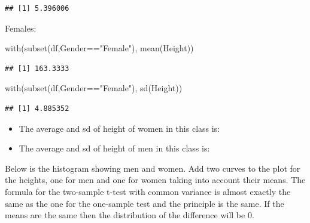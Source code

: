 \documentclass[
]{gitbook}
\newenvironment{Shaded}{\begin{snugshade}}{\end{snugshade}}
\newcommand{\FunctionTok}[1]{\textcolor[rgb]{0.00,0.00,0.00}{#1}}
\newcommand{\NormalTok}[1]{#1}
\newcommand{\SpecialCharTok}[1]{\textcolor[rgb]{0.00,0.00,0.00}{#1}}
\newcommand{\StringTok}[1]{\textcolor[rgb]{0.31,0.60,0.02}{#1}}
\providecommand{\tightlist}{%
  \setlength{\itemsep}{0pt}\setlength{\parskip}{0pt}}
\begin{document}
\begin{verbatim}
## [1] 5.396006
\end{verbatim}

Females:

\begin{Shaded}
\begin{Highlighting}[]
\FunctionTok{with}\NormalTok{(}\FunctionTok{subset}\NormalTok{(df,Gender}\SpecialCharTok{==}\StringTok{"Female"}\NormalTok{), }\FunctionTok{mean}\NormalTok{(Height))}
\end{Highlighting}
\end{Shaded}

\begin{verbatim}
## [1] 163.3333
\end{verbatim}

\begin{Shaded}
\begin{Highlighting}[]
\FunctionTok{with}\NormalTok{(}\FunctionTok{subset}\NormalTok{(df,Gender}\SpecialCharTok{==}\StringTok{"Female"}\NormalTok{), }\FunctionTok{sd}\NormalTok{(Height))}
\end{Highlighting}
\end{Shaded}

\begin{verbatim}
## [1] 4.885352
\end{verbatim}

\begin{itemize}
\tightlist
\item
  The average and sd of height of women in this class is:
\item
  The average and sd of height of men in this class is:
\end{itemize}


Below is the histogram showing men and women. Add two curves to the plot for the heights, one for men and one for women taking into account their means. The formula for the two-sample t-test with common variance is almost exactly the same as the one for the one-sample test and the principle is the same. If the means are the same then the distribution of the difference will be 0.
\end{document}
